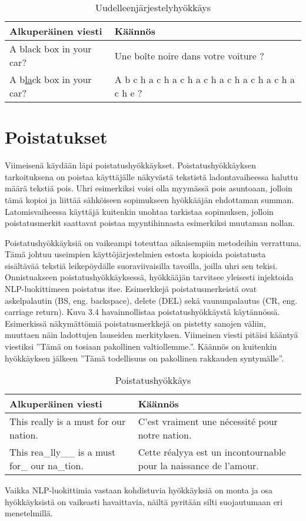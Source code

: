 \begin{table}[hbt]
  \begin{tabular}{| l | m{20em} |}
    \hline
    Alkuperäinen viesti & Käännös\\
    \hline
    A black box in your car? & Une boîte noire dans votre voiture ?\\
    \hline
    A b\underline{la}ck box in your car? & A b c h a c h a c h a c h a c h a c h a c h a c h e ?\\
    \hline
  \end{tabular}
  \caption{Uudelleenjärjestelyhyökkäys \citep{boucher2021bad}}
\end{table}

\section{Poistatukset}

Viimeisenä käydään läpi poistatushyökkäykset. Poistatushyökkäyksen tarkoituksena on poistaa käyttäjälle näkyvästä tekstistä ladontavaiheessa haluttu määrä tekstiä pois. Uhri esimerkiksi voisi olla myymässä pois asuntoaan, jolloin tämä kopioi ja liittää sähköiseen sopimukseen hyökkääjän ehdottaman summan. Latomisvaiheessa käyttäjä kuitenkin unohtaa tarkistaa sopimuksen, jolloin poistatusmerkit saattavat poistaa myyntihinnasta esimerkiksi muutaman nollan.

Poistatushyökkäyksiä on vaikeampi toteuttaa aikaisempiin metodeihin verrattuna. Tämä johtuu useimpien käyttöjärjestelmien estosta kopioida poistatusta sisältävää tekstiä leikepöydälle suoraviivaisilla tavoilla, joilla uhri sen tekisi. Onnistuakseen poistatushyökkäyksessä, hyökkääjän tarvitsee yleisesti injektoida NLP-luokittimeen poistatus itse. Esimerkkejä poistatusmerkeistä ovat askelpalautin (BS, eng. backspace), delete (DEL) sekä vaununpalautus (CR, eng. carriage return). \citep{boucher2021bad}
Kuva 3.4 havainnollistaa poistatushyökkäystä käytännössä. Esimerkissä  näkymättömiä poistatusmerkkejä on pistetty sanojen väliin, muuttaen näin ladottujen lauseiden merkityksen. Viimeinen viesti pitäisi kääntyä viestiksi ''Tämä on tosiaan pakollinen valtiollemme.''. Käännös on kuitenkin hyökkäyksen jälkeen ''Tämä todellisuus on pakollinen rakkauden syntymälle''.

\begin{table}[hbt]
  \begin{tabular}{| l | m{17em} |}
    \hline
    Alkuperäinen viesti & Käännös\\
    \hline
    This really is a must for our nation. & C'est vraiment une nécessité pour notre nation.\\
    \hline
    This rea\_lly\_\_ is a must for\_ our na\_tion. & Cette réalyya est un incontournable pour la naissance de l'amour.\\
    \hline
  \end{tabular}
  \caption{Poistatushyökkäys \citep{boucher2021bad}}
\end{table}

Vaikka NLP-luokittimia vastaan kohdistuvia hyökkäyksiä on monta ja osa hyökkäyksistä on vaikeasti havaittavia, näiltä pyritään silti suojautumaan eri menetelmillä.